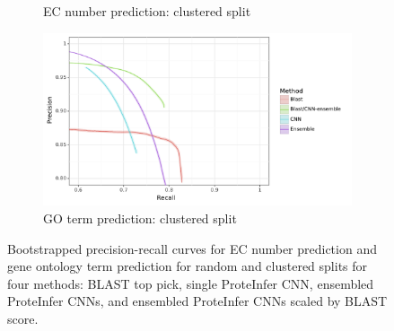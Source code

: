\begin{figure}[ht]
\begin{subfigure}[b]{0.5\linewidth}
    \caption{EC number prediction: clustered split} 
    \label{with_ensemble:c} 
  \end{subfigure}%
  \begin{subfigure}[b]{0.5\linewidth}
    \centering
    \includegraphics[width=1\linewidth]{Figures/clustered_truncated_go.pdf}
    \caption{GO term prediction: clustered split} 
    \label{with_ensemble:d} 
  \end{subfigure} 
  \caption{Bootstrapped precision-recall curves for EC number prediction and gene ontology term prediction for random and clustered splits for four methods: BLAST top pick, single ProteInfer CNN, ensembled ProteInfer CNNs, and ensembled ProteInfer CNNs scaled by BLAST score. }
  \label{with_ensemble} 
\end{figure}



